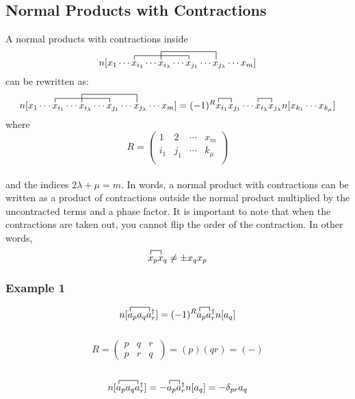 \documentclass{article}
\newcommand{\dg}{\ensuremath{^\dagger} }
\newcommand{\cd}{\ensuremath{\cdots} }
\begin{document}
\subsection{Normal Products with Contractions}
A normal products with contractions inside
\[ 
\contraction{n[x_1 \cd }{x}{{}_{i_1} \cd x_{i_\lambda} \cd }{x}
\contraction[2ex]{n[x_1 \cd x_{i_1} \cd}{ x}{{}_{i_\lambda} \cd x_{j_1} \cd }{x} 
n[x_1 \cd x_{i_1} \cd x_{i_\lambda} \cd x_{j_1} \cd x_{j_\lambda} \cd x_m] 
\] 
can be rewritten as: 
\[ 
\contraction{n[x_1 \cd }{x}{{}_{i_1} \cd x_{i_\lambda} \cd }{x}
\contraction[2ex]{n[x_1 \cd x_{i_1} \cd}{ x}{{}_{i_\lambda} \cd x_{j_1} \cd }{x} 
n[x_1 \cd x_{i_1} \cd x_{i_\lambda} \cd x_{j_1} \cd x_{j_\lambda} \cd x_m] 
= 
\contraction{(-1)^R}{x}{{}_{i_1} }{x}
\contraction{(-1)^R x_{i_1}x_{j_1} \cd}{x}{{}_{i_\lambda} }{x}
(-1)^R x_{i_1}x_{j_1} \cd x_{i_\lambda} x_{j_\lambda} n[x_{k_1} \cd x_{k_\mu}]
\] 
where 
\[
R = 
\begin{pmatrix}
1 & 2 & \cd & x_m  \\
i_1 & j_1 & \cd& k_\mu \\
\end{pmatrix}
\] \\
and the indices $2\lambda + \mu = m$.
In words, a normal product with contractions can be written as a product of contractions outside the normal product multiplied by the uncontracted terms and a phase factor. 
It is important to note that when the contractions are taken out, you cannot flip the order of the contraction.
In other words, 
\[ \contraction{}{x}{{}_p}{x}
x_p x_q \neq \pm x_q x_p  \]
\subsubsection{Example 1}
\[\contraction{n[}{a}{{}_p a_q }{a}
\contraction{n[a_p a_q a_r\dg] = (-)^R a}{a}{_p}{a}
n[a_p a_q a_r\dg] = (-1)^R a_p a_r\dg n[a_q] \] \\
\[
R = 
\begin{pmatrix}
p & q & r  \\
p & r& q\
\end{pmatrix}
= (p)(qr) = (-)
\] \\
\[\contraction{n[}{a}{{}_p a_q }{a}
\contraction{n[a_p a_q a_r\dg] = -}{a}{{}_p}{a}
n[a_p a_q a_r\dg] = - a_p a_r\dg n[a_q] = -\delta_{pr}a_q \]
\end{document}
